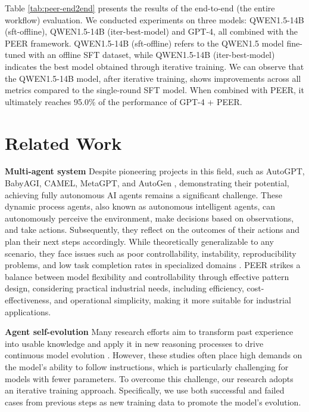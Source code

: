 \documentclass[11pt]{article}
\begin{document}
Table \ref{tab:peer-end2end} presents the results of the end-to-end (the entire workflow) evaluation. We conducted experiments on three models: QWEN1.5-14B (sft-offline), QWEN1.5-14B (iter-best-model) and GPT-4, all combined with the PEER framework. QWEN1.5-14B (sft-offline) refers to the QWEN1.5 model fine-tuned with an offline SFT dataset, while QWEN1.5-14B (iter-best-model) indicates the best model obtained through iterative training. We can observe that the QWEN1.5-14B model, after iterative training, shows improvements across all metrics compared to the single-round SFT model. When combined with PEER, it ultimately reaches 95.0\% of the performance of GPT-4 + PEER.

\section{Related Work}
\textbf{Multi-agent system} Despite pioneering projects in this field, such as AutoGPT, BabyAGI, CAMEL, MetaGPT, and AutoGen \cite{baby-agi,metagpt,camel,autogen,agent-survey,agent-survey-2}, demonstrating their potential, achieving fully autonomous AI agents remains a significant challenge. These dynamic process agents, also known as autonomous intelligent agents, can autonomously perceive the environment, make decisions based on observations, and take actions. Subsequently, they reflect on the outcomes of their actions and plan their next steps accordingly. While theoretically generalizable to any scenario, they face issues such as poor controllability, instability, reproducibility problems, and low task completion rates in specialized domains \cite{agent-survey,agent-survey-2}. PEER strikes a balance between model flexibility and controllability through effective pattern design, considering practical industrial needs, including efficiency, cost-effectiveness, and operational simplicity, making it more suitable for industrial applications.

\textbf{Agent self-evolution} Many research efforts aim to transform past experience into usable knowledge and apply it in new reasoning processes to drive continuous model evolution \cite{evolv-1,evolv-2,evolv-survey,expel}. However, these studies often place high demands on the model's ability to follow instructions, which is particularly challenging for models with fewer parameters. To overcome this challenge, our research adopts an iterative training approach. Specifically, we use both successful and failed cases from previous steps as new training data to promote the model's evolution.
\end{document}
